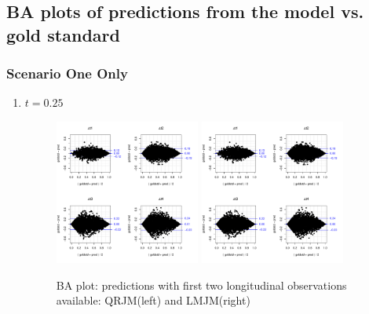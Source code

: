\documentclass{article}
\begin{document}
\subsection{BA plots of predictions from the model vs. gold standard}

\subsubsection*{Scenario One Only}

\begin{enumerate}
\item $t=0.25$

\begin{figure}[H]
\centering
\includegraphics[width=0.45\textwidth]{qt25fit_t1.pdf}
\includegraphics[width=0.45\textwidth]{meanfit_t1.pdf}
\caption{BA plot: predictions with first two longitudinal observations available: QRJM(left) and LMJM(right)}
\end{figure}




\end{enumerate}
\end{document}
